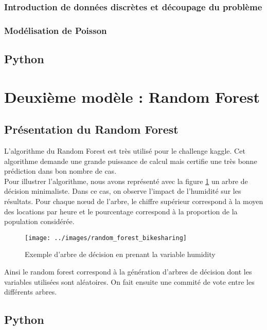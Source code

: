 \subsubsection{Introduction de données discrètes et découpage du problème}

\subsubsection{Modélisation de Poisson}

\subsection{Python}

\section{Deuxième modèle : Random Forest}

\subsection{Présentation du Random Forest}

L'algorithme du Random Forest est très utilisé pour le challenge kaggle. Cet algorithme demande une grande puissance de calcul mais certifie une très bonne prédiction dans bon nombre de cas.\\

Pour illustrer l'algorithme, nous avons représenté avec la figure \ref{arbredecision} un arbre de décision minimaliste. Dans ce cas, on observe l'impact de l'humidité sur les résultats. Pour chaque nœud de l'arbre, le chiffre supérieur correspond à la moyen des locations par heure et le pourcentage correspond à la proportion de la population considérée.

\begin{figure}[h]
	\centering
	\texttt{[image: ../images/random\_forest\_bikesharing]}
	\caption{Exemple d'arbre de décision en prenant la variable humidity}
	\label{arbredecision}
\end{figure}

Ainsi le random forest correspond à la génération d'arbres de décision dont les variables utilisées sont aléatoires. On fait ensuite une commité de vote entre les différents arbres.\\

\subsection{Python}

